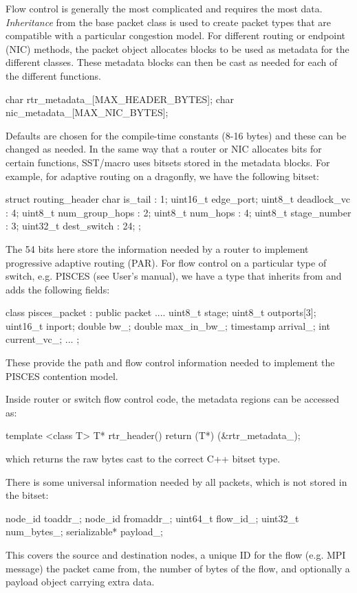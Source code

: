 Flow control is generally the most complicated and requires the most data. 
\emph{Inheritance} from the base packet class is used to create packet types that are compatible with a particular congestion model.
For different routing or endpoint (NIC) methods, the packet object allocates blocks to be used as metadata for the different classes. 
These metadata blocks can then be cast as needed for each of the different functions.

\begin{CppCode}
char rtr_metadata_[MAX_HEADER_BYTES];
char nic_metadata_[MAX_NIC_BYTES];
\end{CppCode}
Defaults are chosen for the compile-time constants (8-16 bytes) and these can be changed as needed.
In the same way that a router or NIC allocates bits for certain functions, SST/macro uses bitsets stored in the metadata blocks.
For example, for adaptive routing on a dragonfly, we have the following bitset:

\begin{CppCode}
struct routing_header  {
 char is_tail : 1;
 uint16_t edge_port; 
 uint8_t deadlock_vc : 4;
 uint8_t num_group_hops : 2;
 uint8_t num_hops : 4;
 uint8_t stage_number : 3;
 uint32_t dest_switch : 24;
};
\end{CppCode}
The 54 bits here store the information needed by a router to implement progressive adaptive routing (PAR). 
For flow control on a particular type of switch, e.g. PISCES (see User's manual), we have a type 
that inherits from  and adds the following fields:

\begin{CppCode}
class pisces_packet : public packet {
....
uint8_t stage;
uint8_t outports[3];
uint16_t inport;
double bw_;
double max_in_bw_;
timestamp arrival_;
int current_vc_;
...
};
\end{CppCode}
These provide the path and flow control information needed to implement the PISCES contention model.

Inside router or switch flow control code, the metadata regions can be accessed as:
\begin{CppCode}
template <class T>
T* rtr_header()  {
  return (T*) (&rtr_metadata_);
}
\end{CppCode}
which returns the raw bytes cast to the correct C++ bitset type.

There is some universal information needed by all packets, which is not stored in the bitset:

\begin{CppCode}
node_id toaddr_;
node_id fromaddr_;
uint64_t flow_id_;
uint32_t num_bytes_;
serializable* payload_;
\end{CppCode}
This covers the source and destination nodes, a unique ID for the flow (e.g. MPI message) the packet came from, the number of bytes of the flow, and optionally a payload object carrying extra data.

